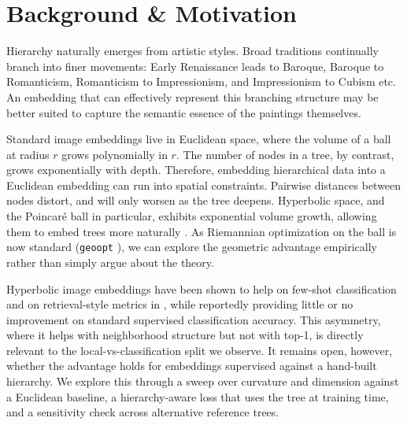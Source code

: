 \section{Background \& Motivation}
\label{sec:background}
Hierarchy naturally emerges from artistic styles.  
Broad traditions continually branch into finer movements: 
Early Renaissance leads to Baroque, Baroque to Romanticism, 
Romanticism to Impressionism, and Impressionism to Cubism etc. 
An embedding that can effectively represent this branching structure 
may be better suited to capture the semantic essence of the 
paintings themselves. 

Standard image embeddings live in Euclidean space, where the 
volume of a ball at radius $r$ grows polynomially in $r$.  
The number of nodes in a tree, by contrast, grows exponentially
 with depth. Therefore, embedding hierarchical data into a 
 Euclidean embedding can run into spatial constraints.  
 Pairwise distances between nodes distort, and will only worsen
  as the tree deepens. Hyperbolic space, and the Poincar\'{e} 
  ball in particular, exhibits exponential volume growth, 
  allowing them to embed trees more naturally 
  \citep{nickel2017poincare,sala2018representation}. 
  As Riemannian optimization on the ball is now standard
(\texttt{geoopt} \citep{kochurov2020geoopt}), 
we can explore the geometric advantage
empirically rather than simply argue about the theory. 

Hyperbolic image embeddings have been shown to help on few-shot
classification and on retrieval-style metrics in
\citet{khrulkov2020hyperbolic}, while reportedly providing little or
no improvement on standard supervised classification accuracy. This
asymmetry, where it helps with neighborhood structure but not with
top-1, is directly relevant to the local-vs-classification split
we observe. It remains open, however, whether the advantage holds
for embeddings supervised against a hand-built hierarchy. We explore
this through a sweep over curvature and dimension against a
Euclidean baseline, a hierarchy-aware loss that uses the tree at
training time, and a sensitivity check across alternative reference
trees.
